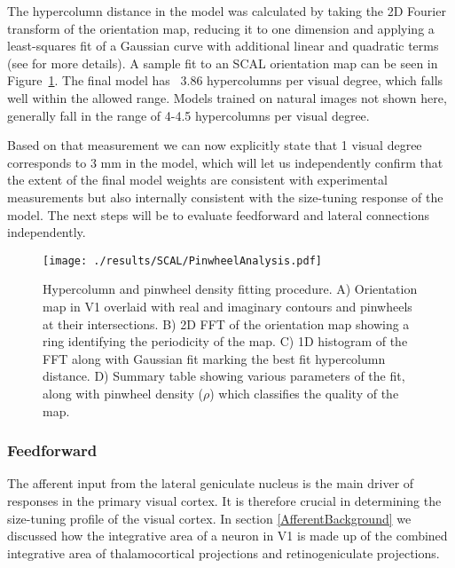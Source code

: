 The hypercolumn distance in the model was calculated by taking the 2D
Fourier transform of the orientation map, reducing it to one dimension
and applying a least-squares fit of a Gaussian curve with additional
linear and quadratic terms (see \cite{Kaschube2010} for more
details). A sample fit to an SCAL orientation map can be seen in
Figure~\ref{SCALhypercolumns}. The final model has ~3.86 hypercolumns
per visual degree, which falls well within the allowed range. Models
trained on natural images not shown here, generally fall in the range
of 4-4.5 hypercolumns per visual degree.

Based on that measurement we can now explicitly state that 1 visual
degree corresponds to 3 mm in the model, which will let us
independently confirm that the extent of the final model weights are
consistent with experimental measurements but also internally
consistent with the size-tuning response of the model. The next steps
will be to evaluate feedforward and lateral connections independently.

\begin{figure}
	\centering
        \texttt{[image: ./results/SCAL/PinwheelAnalysis.pdf]}
	\caption[Hypercolumn and pinwheel density fitting procedure and
      results.]{Hypercolumn and pinwheel density fitting procedure. A)
      Orientation map in V1 overlaid with real and imaginary contours
      and pinwheels at their intersections. B) 2D FFT of the
      orientation map showing a ring identifying the periodicity of
      the map. C) 1D histogram of the FFT along with Gaussian fit
      marking the best fit hypercolumn distance. D) Summary table
      showing various parameters of the fit, along with pinwheel
      density ($\rho$) which classifies the quality of the map.}
	\label{SCALhypercolumns}
\end{figure}

\subsubsection{Feedforward}

The afferent input from the lateral geniculate nucleus is the main
driver of responses in the primary visual cortex. It is therefore
crucial in determining the size-tuning profile of the visual cortex.
In section \ref{AfferentBackground} we discussed how the integrative
area of a neuron in V1 is made up of the combined integrative area of
thalamocortical projections and retinogeniculate projections.

